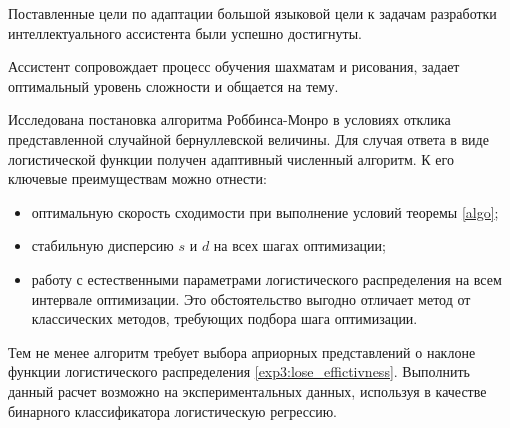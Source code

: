 Поставленные цели по адаптации большой языковой цели к задачам разработки интеллектуального ассистента были успешно достигнуты.


Ассистент сопровождает процесс обучения шахматам и рисования, задает оптимальный уровень сложности и общается на тему.

Исследована постановка алгоритма Роббинса-Монро в условиях отклика представленной случайной бернуллевской величины. 
Для случая ответа в виде логистической функции получен адаптивный численный алгоритм. К его ключевые преимуществам можно отнести:
\begin{itemize}
    \item оптимальную скорость сходимости при выполнение условий теоремы \ref{algo};
    \item стабильную дисперсию $s$ и $d$ на всех шагах оптимизации;
    \item работу с естественными параметрами логистического распределения на всем интервале оптимизации.
    Это обстоятельство выгодно отличает метод от классических методов, требующих подбора шага оптимизации.
\end{itemize}
Тем не менее алгоритм требует выбора априорных представлений о наклоне функции логистического распределения \ref{exp3:lose_effictivness}. 
Выполнить данный расчет возможно на экспериментальных данных, используя в качестве бинарного классификатора логистическую регрессию.
